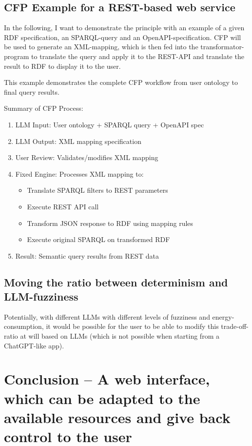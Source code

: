 \documentclass[12pt,a4paper]{article}
\begin{document}
\subsection{CFP Example for a REST-based web service}

In the following, I want to demonstrate the principle with an example of a given RDF specification, an SPARQL-query and an OpenAPI-specification. CFP will be used to generate an XML-mapping, which is then fed into the transformator-program to translate the query and apply it to the REST-API and translate the result to RDF to display it to the user.

This example demonstrates the complete CFP workflow from user ontology to final query results.

Summary of CFP Process:
\begin{enumerate}
    \item LLM Input: User ontology + SPARQL query + OpenAPI spec
    \item LLM Output: XML mapping specification
    \item User Review: Validates/modifies XML mapping
    \item Fixed Engine: Processes XML mapping to:
    \begin{itemize}
        \item Translate SPARQL filters to REST parameters
        \item Execute REST API call
        \item Transform JSON response to RDF using mapping rules
        \item Execute original SPARQL on transformed RDF
    \end{itemize}
    \item Result: Semantic query results from REST data
\end{enumerate}

\newpage

\subsection{Moving the ratio between determinism and LLM-fuzziness}

Potentially, with different LLMs with different levels of fuzziness and energy-consumption, it would be possible for the user to be able to modify this trade-off-ratio at will based on LLMs (which is not possible when starting from a ChatGPT-like app).

\section{Conclusion -- A web interface, which can be adapted to the available resources and give back control to the user}
\end{document}
